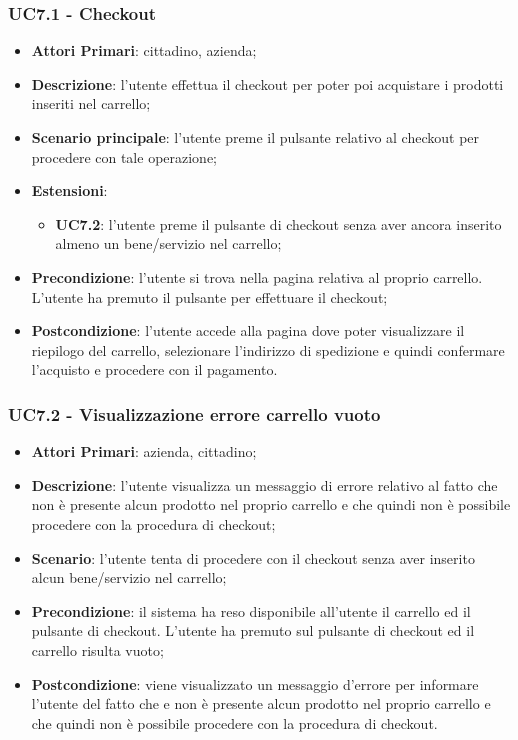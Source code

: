 \subsubsection{UC7.1 - Checkout}
\begin{itemize}
	\item \textbf{Attori Primari}: cittadino, azienda;
	\item \textbf{Descrizione}: l'utente effettua il checkout per poter poi acquistare i prodotti inseriti nel carrello;
	\item \textbf{Scenario principale}: l'utente preme il pulsante relativo al checkout per procedere con tale operazione;
	\item \textbf{Estensioni}: 
	\begin{itemize}
		\item \textbf{UC7.2}: l'utente preme il pulsante di checkout senza aver ancora inserito almeno un bene/servizio nel carrello;
	\end{itemize}
	\item \textbf{Precondizione}: l'utente si trova nella pagina relativa al proprio carrello. L'utente ha premuto il pulsante per effettuare il checkout;
	\item \textbf{Postcondizione}: l'utente accede alla pagina dove poter visualizzare il riepilogo del carrello, selezionare l'indirizzo di spedizione e quindi confermare l'acquisto e procedere con il pagamento.
\end{itemize}

\subsubsection{UC7.2 - Visualizzazione errore carrello vuoto}
\begin{itemize}
	\item \textbf{Attori Primari}: azienda, cittadino;
	\item \textbf{Descrizione}:
	l'utente visualizza un messaggio di errore relativo al fatto che non è presente alcun prodotto nel proprio carrello e che quindi non è possibile procedere con la procedura di checkout;
	\item \textbf{Scenario}: l'utente tenta di procedere con il checkout senza aver inserito alcun bene/servizio nel carrello;
	\item \textbf{Precondizione}: il sistema ha reso disponibile all'utente il carrello ed il pulsante di checkout. L'utente ha premuto sul pulsante di checkout ed il carrello risulta vuoto; 
	\item \textbf{Postcondizione}: viene visualizzato un messaggio d'errore per informare l'utente del fatto che e non è presente alcun prodotto nel proprio carrello e che quindi non è possibile procedere con la procedura di checkout.
\end{itemize}

